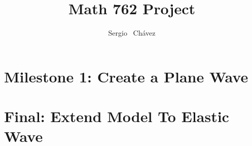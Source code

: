 \documentclass{article}
\title{Math 762 Project}
\author{
  Sergio ~Ch\'{a}vez
}
\begin{document}
\maketitle

\begin{abstract}

\end{abstract}



\section{Milestone 1: Create a Plane Wave}



\section{Final: Extend Model To Elastic Wave}




% 
% 
\end{document}
